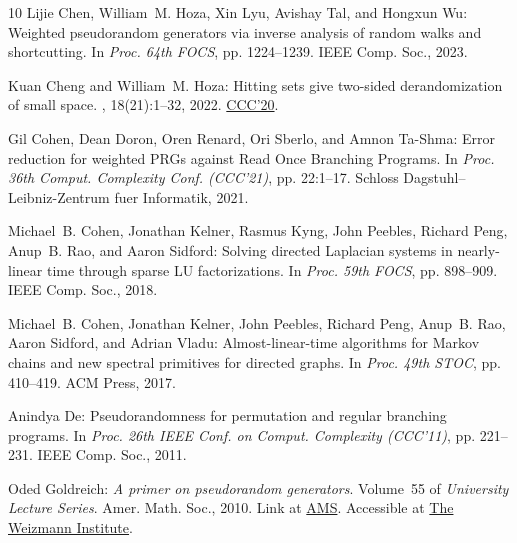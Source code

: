 \documentclass[11pt]{article}
\begin{document}
\begin{thebibliography}{10}
{\sc Lijie Chen, William~M. Hoza, Xin Lyu, Avishay Tal, and Hongxun Wu}:
  Weighted pseudorandom generators via inverse analysis of random walks and
  shortcutting.
\newblock In {\em Proc. 64th FOCS}, pp. 1224--1239. IEEE Comp. Soc., 2023.

{\sc Kuan Cheng and William~M. Hoza}: Hitting sets give two-sided
  derandomization of small space.
, 18(21):1--32, 2022.
\newblock \prelim \href{https://doi.org/10.4230/LIPIcs.CCC.2020.10}{CCC'20}.

{\sc Gil Cohen, Dean Doron, Oren Renard, Ori Sberlo, and Amnon Ta-Shma}: Error
  reduction for weighted {PRGs} against {Read Once Branching Programs}.
\newblock In {\em Proc. 36th Comput. Complexity Conf. (CCC'21)}, pp. 22:1--17.
  Schloss Dagstuhl--Leibniz-Zentrum fuer Informatik, 2021.

{\sc Michael~B. Cohen, Jonathan Kelner, Rasmus Kyng, John Peebles, Richard
  Peng, Anup~B. Rao, and Aaron Sidford}: Solving directed {L}aplacian systems
  in nearly-linear time through sparse {LU} factorizations.
\newblock In {\em Proc. 59th FOCS}, pp. 898--909. IEEE Comp. Soc., 2018.

{\sc Michael~B. Cohen, Jonathan Kelner, John Peebles, Richard Peng, Anup~B.
  Rao, Aaron Sidford, and Adrian Vladu}: Almost-linear-time algorithms for
  {Markov} chains and new spectral primitives for directed graphs.
\newblock In {\em Proc. 49th STOC}, pp. 410--419. ACM Press, 2017.
\newblock [\epfmtdoi{10.1145/3055399.3055463}]

{\sc Anindya De}: Pseudorandomness for permutation and regular branching
  programs.
\newblock In {\em Proc. 26th IEEE Conf. on Comput. Complexity (CCC'11)}, pp.
  221--231. IEEE Comp. Soc., 2011.

{\sc Oded Goldreich}: {\em A primer on pseudorandom generators}.
\newblock Volume~55 of {\em University Lecture Series}.
\newblock Amer. Math. Soc., 2010.
\newblock Link at \href{https://pubs.ams.org/ebooks/ulect/055}{AMS}. Accessible
  at \href{https://www.wisdom.weizmann.ac.il/~oded/PDF/prg10.pdf}{The Weizmann
  Institute}.


\end{thebibliography}
\end{document}
